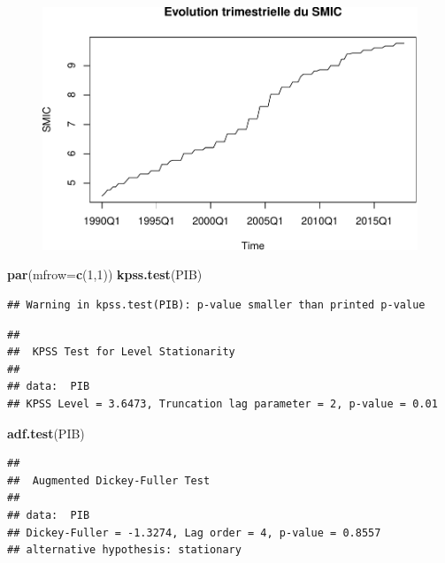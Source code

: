 \documentclass[11pt,]{article}
\newenvironment{Shaded}{\begin{snugshade}}{\end{snugshade}}
\newcommand{\KeywordTok}[1]{\textcolor[rgb]{0.13,0.29,0.53}{\textbf{#1}}}
\newcommand{\DataTypeTok}[1]{\textcolor[rgb]{0.13,0.29,0.53}{#1}}
\newcommand{\DecValTok}[1]{\textcolor[rgb]{0.00,0.00,0.81}{#1}}
\newcommand{\NormalTok}[1]{#1}
\begin{document}
\begin{figure}
\centering
\includegraphics{doc_files/figure-latex/unnamed-chunk-4-1.pdf}
\caption{\label{fig4}}
\end{figure}

\begin{Shaded}
\begin{Highlighting}[]
  \KeywordTok{par}\NormalTok{(}\DataTypeTok{mfrow=}\KeywordTok{c}\NormalTok{(}\DecValTok{1}\NormalTok{,}\DecValTok{1}\NormalTok{))}
  \KeywordTok{kpss.test}\NormalTok{(PIB)}
\end{Highlighting}
\end{Shaded}

\begin{verbatim}
## Warning in kpss.test(PIB): p-value smaller than printed p-value
\end{verbatim}

\begin{verbatim}
## 
##  KPSS Test for Level Stationarity
## 
## data:  PIB
## KPSS Level = 3.6473, Truncation lag parameter = 2, p-value = 0.01
\end{verbatim}

\begin{Shaded}
\begin{Highlighting}[]
  \KeywordTok{adf.test}\NormalTok{(PIB)}
\end{Highlighting}
\end{Shaded}

\begin{verbatim}
## 
##  Augmented Dickey-Fuller Test
## 
## data:  PIB
## Dickey-Fuller = -1.3274, Lag order = 4, p-value = 0.8557
## alternative hypothesis: stationary
\end{verbatim}
\end{document}
